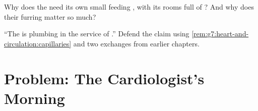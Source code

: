 \begin{exercise}[$\star\star$]\label{exo:g7:heart-and-circulation:11}
Why does the  need its own small feeding ,
with its rooms full of ? And why does their
furring matter so much?
\end{exercise}

\begin{exercise}[$\star\star\star$]\label{exo:g7:heart-and-circulation:12}
``The  is plumbing in the service of
.'' Defend the claim using
\cref{rem:g7:heart-and-circulation:capillaries} and two
exchanges from earlier chapters.
\end{exercise}

\section{Problem: The Cardiologist's Morning}

